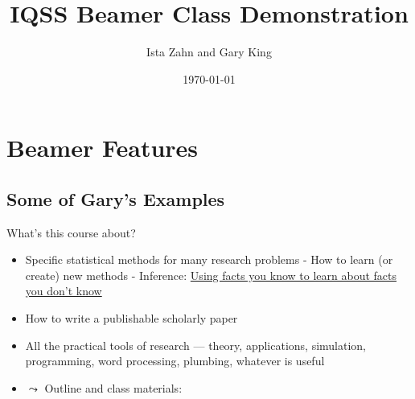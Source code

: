 \documentclass[12pt,ignorenonframetext,compress]{beamer}
\title{\insertsectionhead}
  {
    \definecolor{white}{rgb}{0.776,0.357,0.157}
    \definecolor{iqss@orange}{rgb}{1,1,1}
    \ifnum \insertmainframenumber > \insertframenumber
    \frame{
      \frametitle{\iqsssectiontitleheader}
      \tableofcontents[currentsection]
    }
    \else
    \frame{
      \frametitle{Backup Slides}
      \tableofcontents[sectionstyle=shaded/shaded,subsectionstyle=shaded/shaded/shaded]
    }
    \fi
  }
\title[]{IQSS Beamer Class Demonstration}
\author[
        Ista Zahn and Gary King
    ]{Ista Zahn and Gary King}
\institute[
    ]{
    IQSS
    }
\date[
      \today
  ]{
      \today
        }
\providecommand{\tightlist}{%
  \setlength{\itemsep}{0pt}\setlength{\parskip}{0pt}}
\begin{document}
  \begin{frame}[plain]
  \titlepage
  \end{frame}



\hypertarget{beamer-features}{%
\section{Beamer Features}\label{beamer-features}}

\hypertarget{some-of-garys-examples}{%
\subsection{Some of Gary's Examples}\label{some-of-garys-examples}}

\begin{frame}{What's this course about?}
\protect\hypertarget{whats-this-course-about}{}

\begin{itemize}
\tightlist
\item
  \alert{Specific statistical methods for many research problems} - How
  to learn (or create) new methods - Inference:
  \underline{Using facts you know to learn about
        facts you don't know}
\item
  \alert{How to write a publishable scholarly paper}
\item
  \alert{All the practical tools of research} --- theory, applications,
  simulation, programming, word processing, plumbing, whatever is useful
\item
  \(\leadsto\) \alert{Outline and class materials:}

\end{itemize}

\end{frame}
\end{document}

